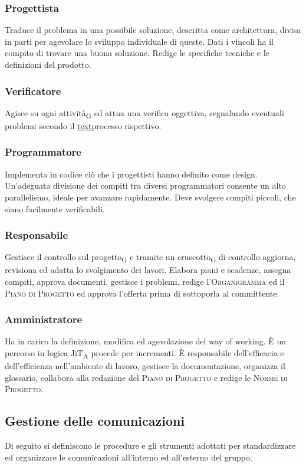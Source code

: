     \subsubsection{Progettista}
    Traduce il problema in una possibile soluzione, descritta come architettura, divisa in parti per agevolare lo sviluppo individuale di queste. Dati i vincoli ha il compito di trovare una buona soluzione. Redige le specifiche tecniche e le definizioni del prodotto.
    \subsubsection{Verificatore}
    Agisce su ogni attività\textsubscript{G} ed attua una verifica oggettiva, segnalando eventuali problemi secondo il \hyperref[label]{text}{processo rispettivo}.
    \subsubsection{Programmatore}
    Implementa in codice ciò che i progettisti hanno definito come design. Un'adeguata divisione dei compiti tra diversi programmatori consente un alto parallelismo, ideale per avanzare rapidamente. Deve svolgere compiti piccoli, che siano facilmente verificabili.
    \subsubsection{Responsabile}
    Gestisce il controllo sul progetto\textsubscript{G} e tramite un cruscotto\textsubscript{G} di controllo aggiorna, revisiona ed adatta lo svolgimento dei lavori. Elabora piani e scadenze, assegna compiti, approva documenti, gestisce i problemi, redige l'\textsc{Organigramma} ed il \textsc{Piano di Progetto} ed approva l'offerta prima di sottoporla al committente.
    \subsubsection{Amministratore}
    Ha in carico la definizione, modifica ed agevolazione del way of working. È un percorso in logica JiT\textsubscript{A} procede per incrementi. È responsabile dell'efficacia e dell'efficienza nell'ambiente di lavoro, gestisce la documentazione, organizza il glossario, collabora alla redazione del \textsc{Piano di Progetto} e redige le \textsc{Norme di Progetto}.

\subsection{Gestione delle comunicazioni}
    Di seguito si definiscono le procedure e gli strumenti adottati per standardizzare ed organizzare le comunicazioni all'interno ed all'esterno del gruppo.
